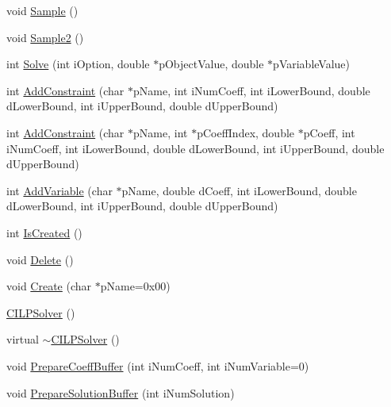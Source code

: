 \begin{DoxyCompactItemize}
\item 
void \mbox{\hyperlink{classCILPSolver_a1d1ea568feb782e04e1b0125fc6e5259}{Sample}} ()
\item 
void \mbox{\hyperlink{classCILPSolver_a0317f6476130a3e99e2f771ce9dddb5e}{Sample2}} ()
\item 
int \mbox{\hyperlink{classCILPSolver_a36ff606e74d53c1f27af593ffff7286d}{Solve}} (int i\+Option, double $\ast$p\+Object\+Value, double $\ast$p\+Variable\+Value)
\item 
int \mbox{\hyperlink{classCILPSolver_ac111a6eb92be7ff2b128e4da4ff6b17e}{Add\+Constraint}} (char $\ast$p\+Name, int i\+Num\+Coeff, int i\+Lower\+Bound, double d\+Lower\+Bound, int i\+Upper\+Bound, double d\+Upper\+Bound)
\item 
int \mbox{\hyperlink{classCILPSolver_a2bfa174a9617174504df71cff757c085}{Add\+Constraint}} (char $\ast$p\+Name, int $\ast$p\+Coeff\+Index, double $\ast$p\+Coeff, int i\+Num\+Coeff, int i\+Lower\+Bound, double d\+Lower\+Bound, int i\+Upper\+Bound, double d\+Upper\+Bound)
\item 
int \mbox{\hyperlink{classCILPSolver_afd9a2ce4366c08b46c70c14edc3fe140}{Add\+Variable}} (char $\ast$p\+Name, double d\+Coeff, int i\+Lower\+Bound, double d\+Lower\+Bound, int i\+Upper\+Bound, double d\+Upper\+Bound)
\item 
int \mbox{\hyperlink{classCILPSolver_ad6f7b432268e09326cb78d6a38656dc8}{Is\+Created}} ()
\item 
void \mbox{\hyperlink{classCILPSolver_a470b31f458be6d7584828e7656f65f75}{Delete}} ()
\item 
void \mbox{\hyperlink{classCILPSolver_ade3a95ce07777f2eff2b4e2fd4b7d8a1}{Create}} (char $\ast$p\+Name=0x00)
\item 
\mbox{\hyperlink{classCILPSolver_aa2e61e2697edcf8f2962a7402538390f}{C\+I\+L\+P\+Solver}} ()
\item 
virtual \mbox{\hyperlink{classCILPSolver_a5c6e432973cafaf8fbab69f3d9bbdafb}{$\sim$\+C\+I\+L\+P\+Solver}} ()
\item 
void \mbox{\hyperlink{classCILPSolver_a82a1cd2f0982ada9139b952b5e1b034e}{Prepare\+Coeff\+Buffer}} (int i\+Num\+Coeff, int i\+Num\+Variable=0)
\item 
void \mbox{\hyperlink{classCILPSolver_a590eb1701b92960296dd583bd5dc41b6}{Prepare\+Solution\+Buffer}} (int i\+Num\+Solution)
\end{DoxyCompactItemize}

